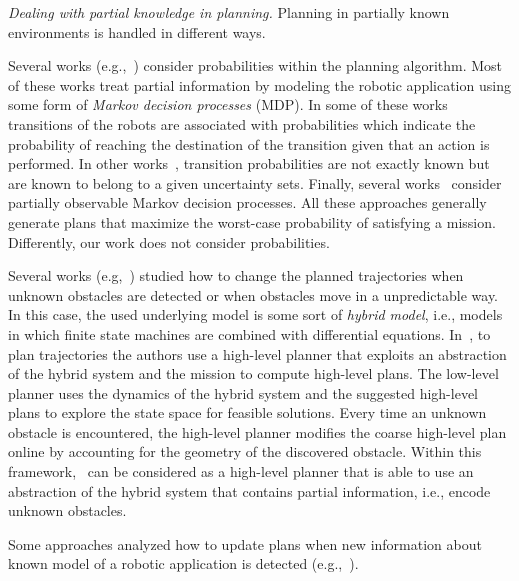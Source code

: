 \emph{Dealing with partial knowledge in planning.}
Planning in partially known environments is handled in different ways. 
\begin{enumerate*}
\item Several works (e.g.,~\cite{ding2011ltl,kurniawati2011motion,wolff2012robust,du2012robot,Roy2006,chen2012ltl,nikou2017probabilistic,7078886,7139350,narayanan2015task}) consider probabilities within the planning algorithm.
Most of these works  treat partial information by modeling the robotic application using some form of \emph{Markov decision processes} (MDP).
In some of these works~\cite{ding2011ltl,chen2012ltl} transitions of the robots are associated with probabilities which indicate the probability of reaching the destination of the transition given that an action is performed.
In other works~\cite{wolff2012robust}, transition probabilities are not exactly known but are known to belong to a given uncertainty sets.
Finally, several works~\cite{kurniawati2011motion,Roy2006} consider partially observable Markov decision processes.
All these approaches generally generate plans that maximize the worst-case probability of satisfying a mission.
Differently, our work does not consider probabilities.
\item Several works (e.g,~\cite{lahijanian2016iterative,livingston2012backtracking,l2014safety,nie2016searching,7139412}) studied how to change the planned trajectories when unknown obstacles are detected or when obstacles move in a unpredictable way.
In this case, the used underlying model is some sort of \emph{hybrid model}, i.e., models in which finite state machines are combined with differential equations. 
In~\cite{lahijanian2016iterative}, to plan trajectories the authors use a high-level planner that exploits an abstraction of the hybrid system and the mission to compute high-level plans. 
The low-level planner uses the dynamics of the hybrid system and the suggested high-level plans to explore the state space for feasible solutions.
Every time an unknown obstacle is encountered, the high-level planner modifies the coarse high-level plan online by accounting for the geometry of the discovered obstacle. 
Within this framework, \toolName\ can be considered as a high-level planner that is able to use an abstraction of the hybrid system that contains partial information, i.e., encode unknown obstacles.
\item Some  approaches  analyzed how to update plans when new information about known model of a robotic application is detected (e.g.,~\cite{guo2015multi}). 

\end{enumerate*}
